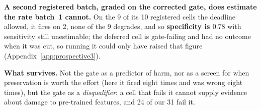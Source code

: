 \textbf{A second registered batch, graded on the corrected gate, does estimate the
rate batch~1 cannot.}  On the 9 of its 10 registered cells the deadline allowed,
it fires on 2, none of the 9 degrades, and so \textbf{specificity is $0.78$} with
sensitivity still unestimable; the deferred cell is gate-failing and had no
outcome when it was cut, so running it could only have raised that figure
(Appendix~\ref{app:prospective3}).

\textbf{What survives.} Not the gate as a predictor of harm, nor as a screen for
when preservation is worth the effort (here it fired eight times and was wrong
eight times), but the gate as a \emph{disqualifier}: a cell that fails it cannot
supply evidence about damage to pre-trained features, and 24 of our 31 fail it.

